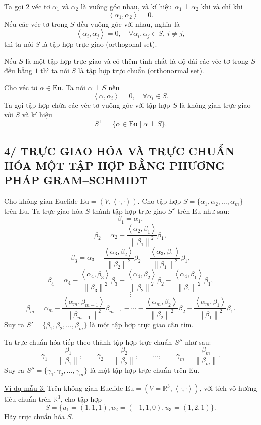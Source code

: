 \documentclass[12pt,a4paper]{article}
\newcommand{\R}{\mathbb{R}}
\newcommand{\Eu}{\mathrm{Eu}}
\newcommand{\ip}[2]{\left\langle #1,#2\right\rangle}
\newcommand{\norm}[1]{\left\lVert #1\right\rVert}
\begin{document}
Ta gọi 2 véc tơ $\alpha_1$ và $\alpha_2$ là vuông góc nhau, và kí hiệu $\alpha_1\perp\alpha_2$ khi và chỉ khi
\[
\ip{\alpha_1}{\alpha_2}=0.
\]
Nếu các véc tơ trong $S$ đều vuông góc với nhau, nghĩa là
\[
\ip{\alpha_i}{\alpha_j}=0,\quad\forall\alpha_i,\alpha_j\in S,\ i\ne j,
\]
thì ta nói $S$ là tập hợp trực giao (orthogonal set).

Nếu $S$ là một tập hợp trực giao và có thêm tính chất là độ dài các véc tơ trong $S$ đều bằng $1$ thì ta nói $S$ là tập hợp trực chuẩn (orthonormal set).

Cho véc tơ $\alpha\in\Eu$. Ta nói $\alpha\perp S$ nếu
\[
\ip{\alpha}{\alpha_i}=0,\quad\forall\alpha_i\in S.
\]
Ta gọi tập hợp chứa các véc tơ vuông góc với tập hợp $S$ là không gian trực giao với $S$ và kí hiệu
\[
S^\perp=\{\alpha\in\Eu\mid \alpha\perp S\}.
\]

\subsection*{4/ TRỰC GIAO HÓA VÀ TRỰC CHUẨN HÓA MỘT TẬP HỢP BẰNG PHƯƠNG PHÁP GRAM--SCHMIDT}
Cho không gian Euclide $\Eu=(V,\ip{\cdot}{\cdot})$. Cho tập hợp $S=\{\alpha_1,\alpha_2,\ldots,\alpha_m\}$ trên $\Eu$.
Ta trực giao hóa $S$ thành tập hợp trực giao $S'$ trên $\Eu$ như sau:
\[
\beta_1=\alpha_1,
\]
\[
\beta_2=\alpha_2-\frac{\ip{\alpha_2}{\beta_1}}{\norm{\beta_1}^2}\beta_1,
\]
\[
\beta_3=\alpha_3-\frac{\ip{\alpha_3}{\beta_2}}{\norm{\beta_2}^2}\beta_2
-\frac{\ip{\alpha_3}{\beta_1}}{\norm{\beta_1}^2}\beta_1,
\]
\[
\beta_4=\alpha_4-\frac{\ip{\alpha_4}{\beta_3}}{\norm{\beta_3}^2}\beta_3
-\frac{\ip{\alpha_4}{\beta_2}}{\norm{\beta_2}^2}\beta_2
-\frac{\ip{\alpha_4}{\beta_1}}{\norm{\beta_1}^2}\beta_1,
\]
\[
\vdots
\]
\[
\beta_m=\alpha_m-\frac{\ip{\alpha_m}{\beta_{m-1}}}{\norm{\beta_{m-1}}^2}\beta_{m-1}-\cdots
-\frac{\ip{\alpha_m}{\beta_2}}{\norm{\beta_2}^2}\beta_2
-\frac{\ip{\alpha_m}{\beta_1}}{\norm{\beta_1}^2}\beta_1.
\]
Suy ra $S'=\{\beta_1,\beta_2,\ldots,\beta_m\}$ là một tập hợp trực giao cần tìm.

Ta trực chuẩn hóa tiếp theo thành tập hợp trực chuẩn $S''$ như sau:
\[
\gamma_1=\frac{\beta_1}{\norm{\beta_1}},\qquad
\gamma_2=\frac{\beta_2}{\norm{\beta_2}},\qquad
\ldots,\qquad
\gamma_m=\frac{\beta_m}{\norm{\beta_m}}.
\]
Suy ra $S''=\{\gamma_1,\gamma_2,\ldots,\gamma_m\}$ là một tập hợp trực chuẩn trên $\Eu$.

\underline{Ví dụ mẫu 3:} Trên không gian Euclide $\Eu=(V=\R^3,\ip{\cdot}{\cdot})$, với tích vô hướng tiêu chuẩn trên $\R^3$, cho tập hợp
\[
S=\{u_1=(1,1,1),u_2=(-1,1,0),u_3=(1,2,1)\}.
\]
Hãy trực chuẩn hóa $S$.
\end{document}
